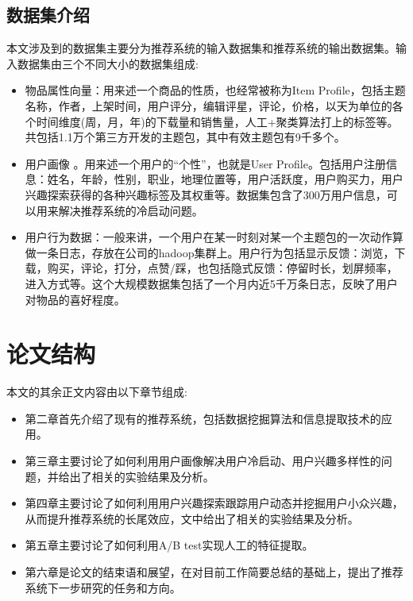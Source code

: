 		\subsection{数据集介绍}
		本文涉及到的数据集主要分为推荐系统的输入数据集和推荐系统的输出数据集。输入数据集由三个不同大小的数据集组成:
		\begin{itemize}
			\item 物品属性向量：用来述一个商品的性质，也经常被称为Item Profile，包括主题名称，作者，上架时间，用户评分，编辑评星，评论，价格，以天为单位的各个时间维度(周，月，年)的下载量和销售量，人工+聚类算法打上的标签等。共包括1.1万个第三方开发的主题包，其中有效主题包有9千多个。
			\item 用户画像 。用来述一个用户的“个性”，也就是User Profile。包括用户注册信息：姓名，年龄，性别，职业，地理位置等，用户活跃度，用户购买力，用户兴趣探索获得的各种兴趣标签及其权重等。数据集包含了300万用户信息，可以用来解决推荐系统的冷启动问题。
			\item 用户行为数据：一般来讲，一个用户在某一时刻对某一个主题包的一次动作算做一条日志，存放在公司的hadoop集群上。用户行为包括显示反馈：浏览，下载，购买，评论，打分，点赞/踩，也包括隐式反馈：停留时长，划屏频率，进入方式等。这个大规模数据集包括了一个月内近5千万条日志，反映了用户对物品的喜好程度。
		\end{itemize}

	\section{论文结构}
	本文的其余正文内容由以下章节组成:
	\begin{itemize}
		\item 第二章首先介绍了现有的推荐系统，包括数据挖掘算法\citep{date-mining}和信息提取技术\citep{info-retrieval}的应用。
		\item 第三章主要讨论了如何利用用户画像解决用户冷启动、用户兴趣多样性的问题，并给出了相关的实验结果及分析。
		\item 第四章主要讨论了如何利用用户兴趣探索跟踪用户动态并挖掘用户小众兴趣，从而提升推荐系统的长尾效应，文中给出了相关的实验结果及分析。
		\item 第五章主要讨论了如何利用A/B test\citep{ab-test}实现人工的特征提取。
		\item 第六章是论文的结束语和展望，在对目前工作简要总结的基础上，提出了推荐系统下一步研究的任务和方向。
	\end{itemize}